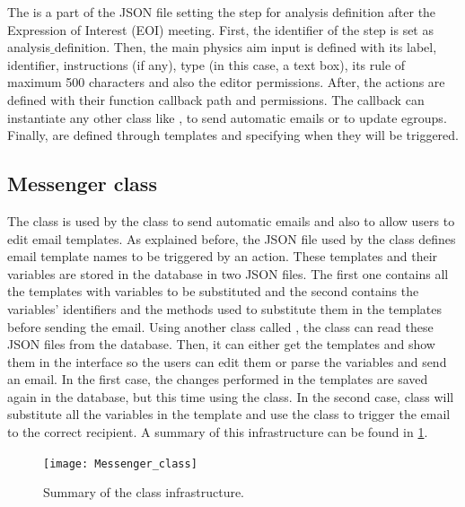 The  is a part of the JSON file setting the step for analysis definition
after the Expression of Interest (EOI) meeting.
First, the identifier of the step is set as analysis$\_$definition.
Then, the main physics aim input is defined with its label, identifier, instructions (if any), type (in this case, a text box), its rule of maximum 500 characters and also the editor permissions. After, the actions are defined with their function callback path and permissions.
The callback can instantiate any other class like , to send automatic emails or  to update egroups.
Finally,  are defined through templates and specifying when they will be triggered.

\subsection{Messenger class}%
\label{sec:Messenger_class}

The  class is used by the  class to send automatic emails and also to allow users to edit email templates. As explained before, the JSON file used by the  class defines email template names to be triggered by an action.
These templates and their variables are stored in the database in two JSON files.
The first one contains all the templates with variables to be substituted and the second contains the variables' identifiers and the methods used to substitute them in the templates before sending the email.
Using another class called , the  class can read these JSON files from the database.
Then, it can either get the templates and show them in the interface so the users can edit them or parse the variables and send an email.
In the first case, the changes performed in the templates are saved again in the database, but this time using the  class.
In the second case,  class will substitute all the variables in the template and use the  class to trigger the email to the correct recipient.
A summary of this infrastructure can be found in \cref{fig:Messenger_class}.

\begin{figure}[htb]
  \centering
  \texttt{[image: Messenger\_class]}
  \caption{Summary of the  class infrastructure. }%
  \label{fig:Messenger_class}
\end{figure}

